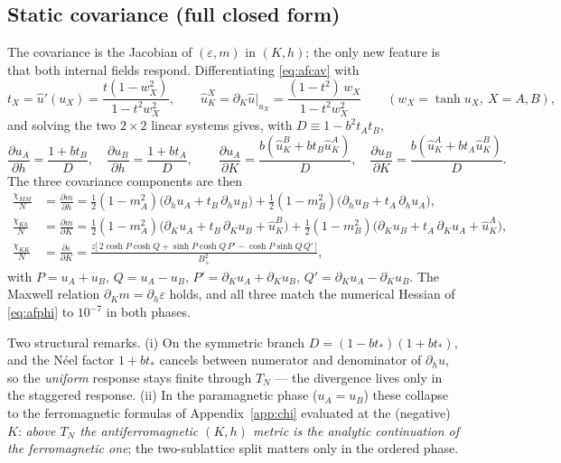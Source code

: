 \documentclass[11pt]{article}
\begin{document}
\subsection{Static covariance (full closed form)}
The covariance is the Jacobian of $(\varepsilon,m)$ in $(K,h)$; the only new feature is that both
internal fields respond. Differentiating \eqref{eq:afcav} with
\begin{equation}
t_X=\hat u'(u_X)=\frac{t(1-w_X^2)}{1-t^2w_X^2},\qquad
\hat u_K^{X}=\partial_K\hat u\big|_{u_X}=\frac{(1-t^2)\,w_X}{1-t^2w_X^2}
\qquad(w_X=\tanh u_X,\ X=A,B),
\end{equation}
and solving the two $2\times2$ linear systems gives, with $D\equiv 1-b^2 t_A t_B$,
\begin{equation}
\frac{\partial u_A}{\partial h}=\frac{1+bt_B}{D},\quad
\frac{\partial u_B}{\partial h}=\frac{1+bt_A}{D},\qquad
\frac{\partial u_A}{\partial K}=\frac{b(\hat u_K^{B}+bt_B\hat u_K^{A})}{D},\quad
\frac{\partial u_B}{\partial K}=\frac{b(\hat u_K^{A}+bt_A\hat u_K^{B})}{D}.
\end{equation}
The three covariance components are then
\begin{align}
\frac{\chi_{MM}}N&=\frac{\partial m}{\partial h}
=\tfrac12(1-m_A^2)\big(\partial_h u_A+t_B\,\partial_h u_B\big)
+\tfrac12(1-m_B^2)\big(\partial_h u_B+t_A\,\partial_h u_A\big),\\[2pt]
\frac{\chi_{Kh}}N&=\frac{\partial m}{\partial K}
=\tfrac12(1-m_A^2)\big(\partial_K u_A+t_B\,\partial_K u_B+\hat u_K^{B}\big)
+\tfrac12(1-m_B^2)\big(\partial_K u_B+t_A\,\partial_K u_A+\hat u_K^{A}\big),\\[2pt]
\frac{\chi_{KK}}N&=\frac{\partial\varepsilon}{\partial K}
=\frac{z\big[\,2\cosh P\cosh Q+\sinh P\cosh Q\,P'-\cosh P\sinh Q\,Q'\,\big]}{B_+^2},
\end{align}
with $P=u_A{+}u_B$, $Q=u_A{-}u_B$, $P'=\partial_K u_A+\partial_K u_B$, $Q'=\partial_K u_A-\partial_K u_B$.
The Maxwell relation $\partial_K m=\partial_h\varepsilon$ holds, and all three match the numerical
Hessian of \eqref{eq:afphi} to $10^{-7}$ in both phases.

Two structural remarks. (i) On the symmetric branch $D=(1-bt_*)(1+bt_*)$, and the N\'eel factor
$1+bt_*$ cancels between numerator and denominator of $\partial_h u$, so the \emph{uniform} response
stays finite through $T_N$ --- the divergence lives only in the staggered response. (ii) In the
paramagnetic phase ($u_A=u_B$) these collapse to the ferromagnetic formulas of Appendix~\ref{app:chi}
evaluated at the (negative) $K$: \emph{above $T_N$ the antiferromagnetic $(K,h)$ metric is the analytic
continuation of the ferromagnetic one}; the two-sublattice split matters only in the ordered phase.
\end{document}
